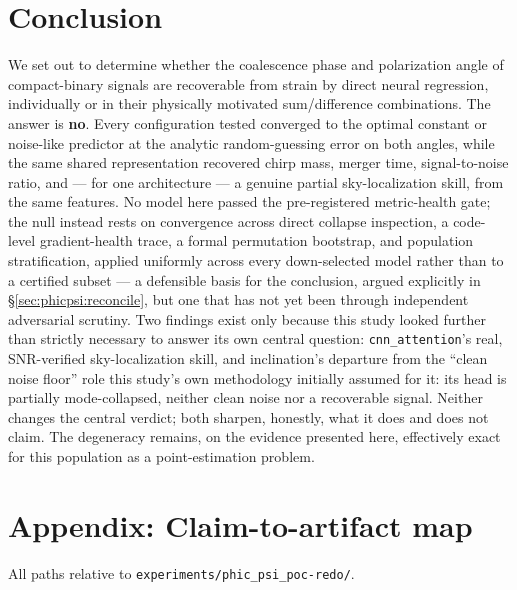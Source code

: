 \section{Conclusion}
\label{sec:phicpsi:conclusion}

We set out to determine whether the coalescence phase and polarization angle of compact-binary signals are recoverable from strain by direct neural regression, individually or in their physically motivated sum/difference combinations.
The answer is \textbf{no}.
Every configuration tested converged to the optimal constant or noise-like predictor at the analytic random-guessing error on both angles, while the same shared representation recovered chirp mass, merger time, signal-to-noise ratio, and --- for one architecture --- a genuine partial sky-localization skill, from the same features.
No model here passed the pre-registered metric-health gate; the null instead rests on convergence across direct collapse inspection, a code-level gradient-health trace, a formal permutation bootstrap, and population stratification, applied uniformly across every down-selected model rather than to a certified subset --- a defensible basis for the conclusion, argued explicitly in \S\ref{sec:phicpsi:reconcile}, but one that has not yet been through independent adversarial scrutiny.
Two findings exist only because this study looked further than strictly necessary to answer its own central question: \texttt{cnn\_attention}'s real, SNR-verified sky-localization skill, and inclination's departure from the ``clean noise floor'' role this study's own methodology initially assumed for it: its head is partially mode-collapsed, neither clean noise nor a recoverable signal.
Neither changes the central verdict; both sharpen, honestly, what it does and does not claim.
The degeneracy remains, on the evidence presented here, effectively exact for this population as a point-estimation problem.


\section*{Appendix: Claim-to-artifact map}
\label{sec:phicpsi:appendix}

All paths relative to \texttt{experiments/phic\_psi\_poc-redo/}.

